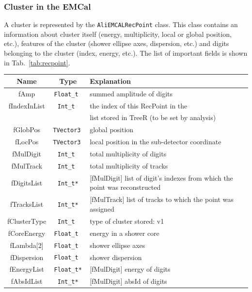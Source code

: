 \subsubsection{Cluster in the EMCal}
A cluster is represented by the \texttt{AliEMCALRecPoint} class. This class contains an information about cluster itself (energy, multiplicity, local or global position, etc.), features of the cluster (shower ellipse axes, dispersion, etc.) and digits belonging to the cluster (index, energy, etc.). The list of important fields is shown in Tab.~\ref{tab:recpoint}.
%
\begin{table}[!h]
\begin{center}
  \begin{tabular}{| c | c | l |}
  \hline
  Name & Type & Explanation \\ 
  \hline
	fAmp              &  \texttt{Float\_t  }  &  summed amplitude of digits   \\
	fIndexInList      &  \texttt{Int\_t    }  &  the index of this RecPoint in the\\
                          &                       &  list stored in TreeR (to be set by analysis)\\
	fGlobPos          &  \texttt{TVector3 }   &  global position\\
	fLocPos           &  \texttt{TVector3 }   &  local  position in the sub-detector coordinate\\
	fMulDigit         &  \texttt{Int\_t    }  &  total multiplicity of digits       \\
	fMulTrack         &  \texttt{Int\_t    }  &  total multiplicity of tracks\\
	fDigitsList       &  \texttt{Int\_t*}     & [fMulDigit] list of digit's indexes from which the point was reconstructed\\
	fTracksList       &  \texttt{Int\_t*}     & [fMulTrack] list of tracks to which the point was assigned\\
	fClusterType      &  \texttt{Int\_t    }  &  type of cluster stored: v1\\
        fCoreEnergy       &  \texttt{Float\_t  }  &  energy in a shower core \\
	fLambda[2]        &  \texttt{Float\_t  }  &  shower ellipse axes\\
	fDispersion       &  \texttt{Float\_t  }  &  shower dispersion\\
	fEnergyList       &  \texttt{Float\_t*}   & [fMulDigit] energy of digits\\
	fAbsIdList        &  \texttt{Int\_t*}     & [fMulDigit] absId  of digits\\

\end{tabular}
\end{center}
\end{table}
